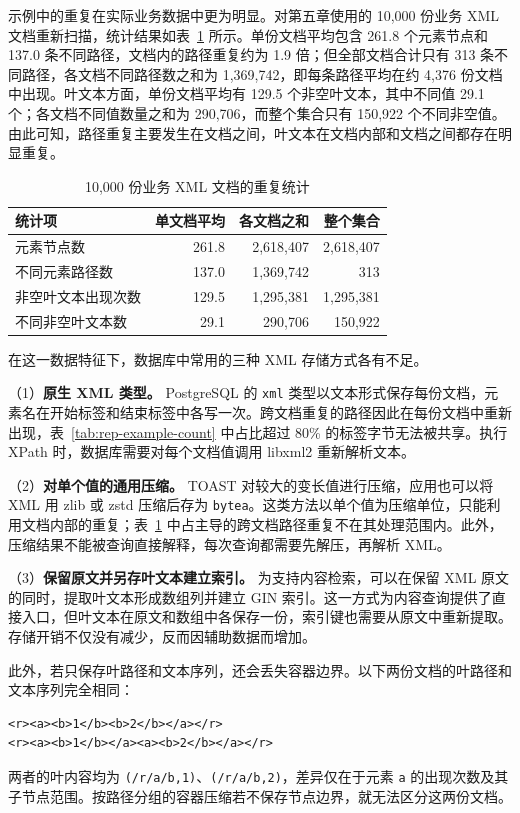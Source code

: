 示例中的重复在实际业务数据中更为明显。对第五章使用的 10,000 份业务 XML 文档重新扫描，统计结果如表~\ref{tab:rep-dataset-count} 所示。单份文档平均包含 261.8 个元素节点和 137.0 条不同路径，文档内的路径重复约为 1.9 倍；但全部文档合计只有 313 条不同路径，各文档不同路径数之和为 1,369,742，即每条路径平均在约 4,376 份文档中出现。叶文本方面，单份文档平均有 129.5 个非空叶文本，其中不同值 29.1 个；各文档不同值数量之和为 290,706，而整个集合只有 150,922 个不同非空值。由此可知，路径重复主要发生在文档之间，叶文本在文档内部和文档之间都存在明显重复。

\begin{table}[htbp]
\centering\small
\caption{10,000 份业务 XML 文档的重复统计}
\label{tab:rep-dataset-count}
\begin{tabular}{lrrr}
\toprule
统计项 & 单文档平均 & 各文档之和 & 整个集合 \\
\midrule
元素节点数 & 261.8 & 2,618,407 & 2,618,407 \\
不同元素路径数 & 137.0 & 1,369,742 & 313 \\
非空叶文本出现次数 & 129.5 & 1,295,381 & 1,295,381 \\
不同非空叶文本数 & 29.1 & 290,706 & 150,922 \\
\bottomrule
\end{tabular}
\end{table}

在这一数据特征下，数据库中常用的三种 XML 存储方式各有不足。

（1）\textbf{原生 XML 类型。} PostgreSQL 的 \texttt{xml} 类型以文本形式保存每份文档，元素名在开始标签和结束标签中各写一次\cite{pg16xmltype}。跨文档重复的路径因此在每份文档中重新出现，表~\ref{tab:rep-example-count} 中占比超过 80\% 的标签字节无法被共享。执行 XPath 时，数据库需要对每个文档值调用 libxml2 重新解析文本\cite{pg16xmlfunc}。

（2）\textbf{对单个值的通用压缩。} TOAST 对较大的变长值进行压缩\cite{pg16toast}，应用也可以将 XML 用 zlib 或 zstd 压缩后存为 \texttt{bytea}。这类方法以单个值为压缩单位，只能利用文档内部的重复；表~\ref{tab:rep-dataset-count} 中占主导的跨文档路径重复不在其处理范围内。此外，压缩结果不能被查询直接解释，每次查询都需要先解压，再解析 XML。

（3）\textbf{保留原文并另存叶文本建立索引。} 为支持内容检索，可以在保留 XML 原文的同时，提取叶文本形成数组列并建立 GIN 索引。这一方式为内容查询提供了直接入口，但叶文本在原文和数组中各保存一份，索引键也需要从原文中重新提取。存储开销不仅没有减少，反而因辅助数据而增加。

此外，若只保存叶路径和文本序列，还会丢失容器边界。以下两份文档的叶路径和文本序列完全相同：
\begin{lstlisting}[caption={具有相同叶内容序列的两种容器组织},label={lst:rep-boundary},numbers=none]
<r><a><b>1</b><b>2</b></a></r>
<r><a><b>1</b></a><a><b>2</b></a></r>
\end{lstlisting}
两者的叶内容均为 \texttt{(/r/a/b,1)}、\texttt{(/r/a/b,2)}，差异仅在于元素 \texttt{a} 的出现次数及其子节点范围。按路径分组的容器压缩若不保存节点边界，就无法区分这两份文档。


